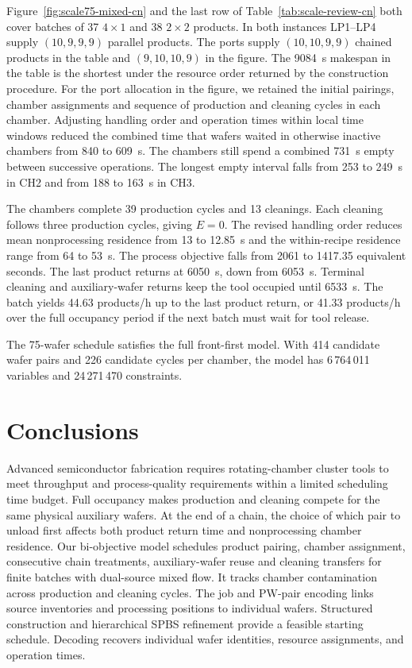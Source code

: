 Figure~\ref{fig:scale75-mixed-cn} and the last row of Table~\ref{tab:scale-review-cn} both cover batches of 37 $4\times1$ and 38 $2\times2$ products. In both instances LP1--LP4 supply $(10,9,9,9)$ parallel products. The ports supply $(10,10,9,9)$ chained products in the table and $(9,10,10,9)$ in the figure. The 9084~s makespan in the table is the shortest under the resource order returned by the construction procedure. For the port allocation in the figure, we retained the initial pairings, chamber assignments and sequence of production and cleaning cycles in each chamber. Adjusting handling order and operation times within local time windows reduced the combined time that wafers waited in otherwise inactive chambers from 840 to 609~s. The chambers still spend a combined 731~s empty between successive operations. The longest empty interval falls from 253 to 249~s in CH2 and from 188 to 163~s in CH3.

The chambers complete 39 production cycles and 13 cleanings. Each cleaning follows three production cycles, giving $E=0$. The revised handling order reduces mean nonprocessing residence from 13 to 12.85~s and the within-recipe residence range from 64 to 53~s. The process objective falls from 2061 to 1417.35 equivalent seconds. The last product returns at 6050~s, down from 6053~s. Terminal cleaning and auxiliary-wafer returns keep the tool occupied until 6533~s. The batch yields 44.63 products/h up to the last product return, or 41.33 products/h over the full occupancy period if the next batch must wait for tool release.

The 75-wafer schedule satisfies the full front-first model. With 414 candidate wafer pairs and 226 candidate cycles per chamber, the model has 6\,764\,011 variables and 24\,271\,470 constraints.

\FloatBarrier
\section{Conclusions}
\label{sec:conclusion-cn}

Advanced semiconductor fabrication requires rotating-chamber cluster tools to meet throughput and process-quality requirements within a limited scheduling time budget. Full occupancy makes production and cleaning compete for the same physical auxiliary wafers. At the end of a chain, the choice of which pair to unload first affects both product return time and nonprocessing chamber residence. Our bi-objective model schedules product pairing, chamber assignment, consecutive chain treatments, auxiliary-wafer reuse and cleaning transfers for finite batches with dual-source mixed flow. It tracks chamber contamination across production and cleaning cycles. The job and PW-pair encoding links source inventories and processing positions to individual wafers. Structured construction and hierarchical SPBS refinement provide a feasible starting schedule. Decoding recovers individual wafer identities, resource assignments, and operation times.

